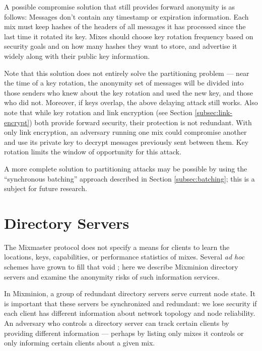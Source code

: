 \documentclass[11pt]{IEEEtran}
\begin{document}
A possible compromise solution that still provides forward anonymity
is as follows:  Messages don't
contain any timestamp or expiration information. Each mix must keep
hashes of the headers of all messages it has processed since the last time
it rotated its key. Mixes should choose key rotation frequency based on
security goals and on how many hashes they want to store, and
advertise it widely along with their public key information.

Note that this solution does not entirely solve the partitioning problem
--- near the time of a key rotation, the anonymity set of messages will
be divided into those senders who knew about the key rotation and used
the new key, and those who did not.  Moreover, if keys overlap, the above
delaying attack still works.
Also note that while key rotation and link encryption (see Section
\ref{subsec:link-encrypt}) both provide forward security, their protection
is not redundant. With only link encryption, an adversary running
one mix could compromise another and use its private key to decrypt
messages previously sent between them. Key rotation limits the window
of opportunity for this attack.

A more complete solution to partitioning attacks may be possible by
using the ``synchronous batching'' approach described in
Section \ref{subsec:batching}; this is a subject for future research.


\section{Directory Servers}
\label{sec:dir-servers}

The Mixmaster protocol does not specify a means for clients to learn the
locations, keys, capabilities, or performance statistics of mixes. Several
\emph{ad hoc} schemes have grown to fill that void \cite{levien}; here
we describe Mixminion directory servers and examine the anonymity risks
of such information services.

In Mixminion, a group of redundant directory servers serve current
node state.  It is important that these servers be synchronized and
redundant:  we lose security if each client has different information
about network topology and node reliability. An adversary who controls
a directory server can track certain clients by providing different
information --- perhaps by listing only mixes it controls or only
informing certain clients about a given mix.
\end{document}
